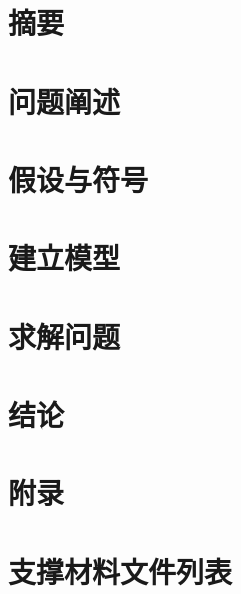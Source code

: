 \documentclass[zihao=-4,UTF8]{ctexart}
\begin{document}
\section*{摘要}

\newpage

\section{问题阐述}

\section{假设与符号}

\section{建立模型}

\section{求解问题}

\newpage
\section*{结论}


\newpage
\section*{附录}


\section*{支撑材料文件列表}
\end{document}
